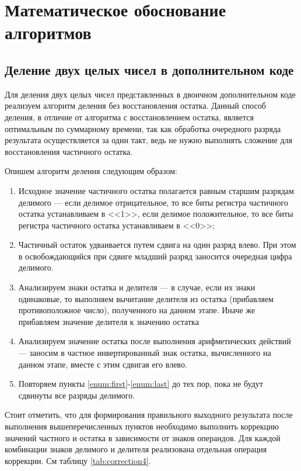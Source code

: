 \documentclass[a4paper,14pt]{extarticle}
\begin{document}
\section{Математическое обоснование алгоритмов}
\subsection{Деление двух целых чисел в дополнительном коде}
Для деления двух целых чисел представленных в двоичном дополнительном коде реализуем алгоритм деления без восстановления остатка. Данный способ деления, в отличие от алгоритма с восстановлением остатка, является оптимальным по суммарному времени, так как обработка очередного разряда результата осуществляется за один такт, ведь не нужно выполнять сложение для восстановления частичного остатка.

Опишем алгоритм деления следующим образом:
\begin{enumerate}
	\item \label{enum:first} Исходное значение частичного остатка полагается равным старшим разрядам делимого --- если делимое отрицательное, то все биты регистра частичного остатка устанавливаем в <<1>>, если делимое положительное, то все биты регистра частичного остатка устанавливаем в <<0>>;
	\item Частичный остаток удваивается путем сдвига на один разряд влево. При этом в освобождающийся при сдвиге младший разряд заносится очередная цифра делимого.
	\item Анализируем знаки остатка и делителя --- в случае, если их знаки одинаковые, то выполняем вычитание делителя из остатка (прибавляем противоположное число), полученного на данном этапе. Иначе же прибавляем значение делителя к значению остатка%
	\item \label{enum:last} Анализируем значение остатка после выполнения арифметических действий --- заносим в частное инвертированный знак остатка, вычисленного на данном этапе, вместе с этим сдвигая его влево. 
	\item Повторяем пункты \ref{enum:first}-\ref{enum:last} до тех пор, пока не будут сдвинуты все разряды делимого. 
\end{enumerate}

Стоит отметить, что для формирования правильного выходного результата после выполнения вышеперечисленных пунктов необходимо выполнить коррекцию значений частного и остатка в зависимости от знаков операндов. Для каждой комбинации знаков делимого и делителя реализована отдельная операция коррекции. См таблицу \ref{tab:correction4}.
\end{document}

